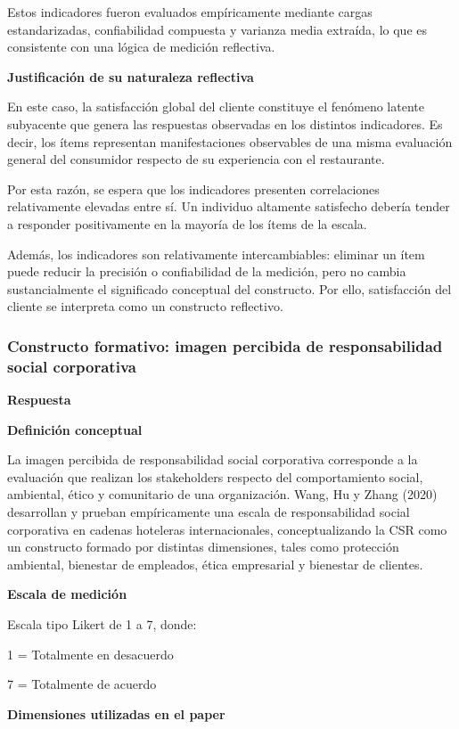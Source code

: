 \documentclass[12pt,letterpaper]{article}
\begin{document}
Estos indicadores fueron evaluados empíricamente mediante cargas estandarizadas, confiabilidad compuesta y varianza media extraída, lo que es consistente con una lógica de medición reflectiva.

\textbf{Justificación de su naturaleza reflectiva}

En este caso, la satisfacción global del cliente constituye el fenómeno latente subyacente que genera las respuestas observadas en los distintos indicadores. Es decir, los ítems representan manifestaciones observables de una misma evaluación general del consumidor respecto de su experiencia con el restaurante.

Por esta razón, se espera que los indicadores presenten correlaciones relativamente elevadas entre sí. Un individuo altamente satisfecho debería tender a responder positivamente en la mayoría de los ítems de la escala.

Además, los indicadores son relativamente intercambiables: eliminar un ítem puede reducir la precisión o confiabilidad de la medición, pero no cambia sustancialmente el significado conceptual del constructo. Por ello, satisfacción del cliente se interpreta como un constructo reflectivo.

\subsubsection*{Constructo formativo: imagen percibida de responsabilidad social corporativa}

\textbf{Respuesta}

\textbf{Definición conceptual}

La imagen percibida de responsabilidad social corporativa corresponde a la evaluación que realizan los stakeholders respecto del comportamiento social, ambiental, ético y comunitario de una organización. Wang, Hu y Zhang (2020) desarrollan y prueban empíricamente una escala de responsabilidad social corporativa en cadenas hoteleras internacionales, conceptualizando la CSR como un constructo formado por distintas dimensiones, tales como protección ambiental, bienestar de empleados, ética empresarial y bienestar de clientes.

\textbf{Escala de medición}

Escala tipo Likert de 1 a 7, donde:

1 = Totalmente en desacuerdo

7 = Totalmente de acuerdo

\textbf{Dimensiones utilizadas en el paper}
\end{document}
